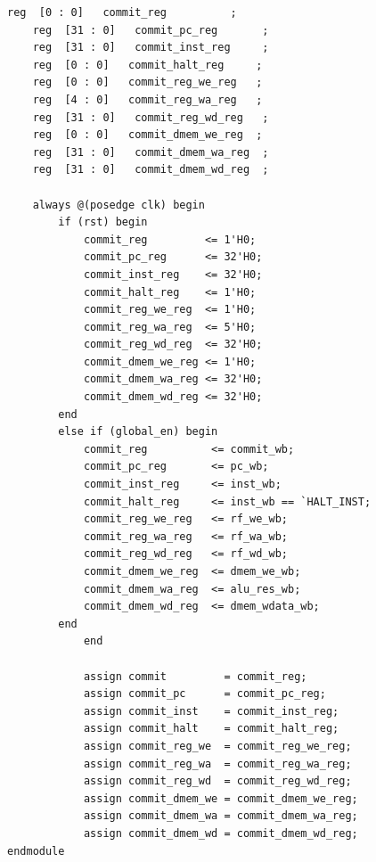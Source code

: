 \documentclass[12pt,a4paper]{ctexart}
\begin{document}
\begin{lstlisting}[style=verilog]
    reg  [0 : 0]   commit_reg          ;
    reg  [31 : 0]   commit_pc_reg       ;
    reg  [31 : 0]   commit_inst_reg     ;
    reg  [0 : 0]   commit_halt_reg     ;
    reg  [0 : 0]   commit_reg_we_reg   ;
    reg  [4 : 0]   commit_reg_wa_reg   ;
    reg  [31 : 0]   commit_reg_wd_reg   ;
    reg  [0 : 0]   commit_dmem_we_reg  ;
    reg  [31 : 0]   commit_dmem_wa_reg  ;
    reg  [31 : 0]   commit_dmem_wd_reg  ;
    
    always @(posedge clk) begin
        if (rst) begin
            commit_reg         <= 1'H0;
            commit_pc_reg      <= 32'H0;
            commit_inst_reg    <= 32'H0;
            commit_halt_reg    <= 1'H0;
            commit_reg_we_reg  <= 1'H0;
            commit_reg_wa_reg  <= 5'H0;
            commit_reg_wd_reg  <= 32'H0;
            commit_dmem_we_reg <= 1'H0;
            commit_dmem_wa_reg <= 32'H0;
            commit_dmem_wd_reg <= 32'H0;
        end
        else if (global_en) begin
            commit_reg          <= commit_wb;
            commit_pc_reg       <= pc_wb;
            commit_inst_reg     <= inst_wb;
            commit_halt_reg     <= inst_wb == `HALT_INST;
            commit_reg_we_reg   <= rf_we_wb;
            commit_reg_wa_reg   <= rf_wa_wb;
            commit_reg_wd_reg   <= rf_wd_wb;
            commit_dmem_we_reg  <= dmem_we_wb;
            commit_dmem_wa_reg  <= alu_res_wb;
            commit_dmem_wd_reg  <= dmem_wdata_wb;
        end
            end
            
            assign commit         = commit_reg;
            assign commit_pc      = commit_pc_reg;
            assign commit_inst    = commit_inst_reg;
            assign commit_halt    = commit_halt_reg;
            assign commit_reg_we  = commit_reg_we_reg;
            assign commit_reg_wa  = commit_reg_wa_reg;
            assign commit_reg_wd  = commit_reg_wd_reg;
            assign commit_dmem_we = commit_dmem_we_reg;
            assign commit_dmem_wa = commit_dmem_wa_reg;
            assign commit_dmem_wd = commit_dmem_wd_reg;
endmodule
\end{lstlisting}
\end{document}
